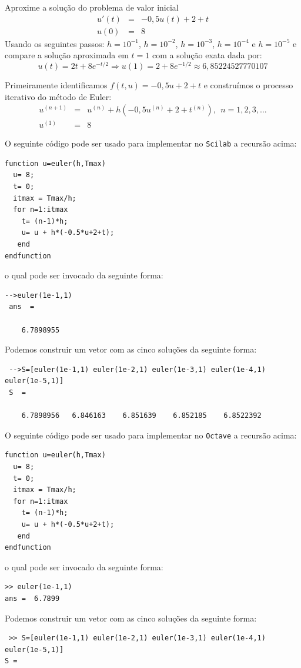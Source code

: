 \begin{exeresol}\label{exeresol:exeresol1} Aproxime a solução do problema de valor inicial
\begin{eqnarray}
     u'(t)&=& -0,5u(t)+2+t\\
            u(0) &=&  8
\end{eqnarray}
Usando os seguintes passos: $h=10^{-1}$, $h=10^{-2}$, $h=10^{-3}$, $h=10^{-4}$ e $h=10^{-5}$ e compare a solução aproximada em $t=1$ com a solução exata dada por:
\begin{equation}
     u(t) = 2t+8e^{-t/2} \Longrightarrow u(1)=2+8e^{-1/2} \approx 6,85224527770107
\end{equation}
\end{exeresol}
\begin{resol} Primeiramente identificamos $f(t,u)=-0,5u+2+t$ e construímos o processo iterativo do método de Euler:
\begin{eqnarray}
  u^{(n+1)}&=&u^{(n)} + h( -0,5u^{(n)}+2+t^{(n)}),~~n=1,2,3,\ldots\\
  u^{(1)}&=&8
\end{eqnarray}

\ifisscilab
O seguinte código pode ser usado para implementar no \verb+Scilab+ a recursão acima:
\begin{verbatim}
function u=euler(h,Tmax)
  u= 8;
  t= 0;
  itmax = Tmax/h;
  for n=1:itmax
    t= (n-1)*h;
    u= u + h*(-0.5*u+2+t);
   end
endfunction
\end{verbatim}
o qual pode ser invocado da seguinte forma:
\begin{verbatim}
-->euler(1e-1,1)
 ans  =

    6.7898955
\end{verbatim}
Podemos construir um vetor com as cinco soluções da seguinte forma:
\begin{verbatim}
 -->S=[euler(1e-1,1) euler(1e-2,1) euler(1e-3,1) euler(1e-4,1) euler(1e-5,1)]
 S  =

    6.7898956   6.846163    6.851639    6.852185    6.8522392
\end{verbatim}

\fi

\ifisoctave
O seguinte código pode ser usado para implementar no \verb+Octave+ a recursão acima:
\begin{verbatim}
function u=euler(h,Tmax)
  u= 8;
  t= 0;
  itmax = Tmax/h;
  for n=1:itmax
    t= (n-1)*h;
    u= u + h*(-0.5*u+2+t);
   end
endfunction
\end{verbatim}
o qual pode ser invocado da seguinte forma:
\begin{verbatim}
>> euler(1e-1,1)
ans =  6.7899
\end{verbatim}
Podemos construir um vetor com as cinco soluções da seguinte forma:
\begin{verbatim}
 >> S=[euler(1e-1,1) euler(1e-2,1) euler(1e-3,1) euler(1e-4,1) euler(1e-5,1)]
S =


\end{verbatim}
\end{resol}
